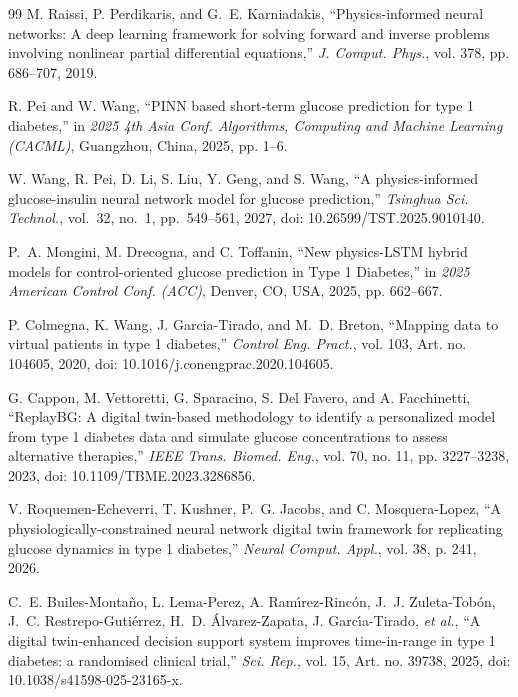 \documentclass[journal]{IEEEtran}
\begin{document}
\begin{thebibliography}{99}
\label{ref8label} M. Raissi, P. Perdikaris, and G.~E. Karniadakis, ``Physics-informed neural networks: A deep learning framework for solving forward and inverse problems involving nonlinear partial differential equations,'' \emph{J. Comput. Phys.}, vol. 378, pp. 686--707, 2019.

\label{ref9label} R. Pei and W. Wang, ``PINN based short-term glucose prediction for type 1 diabetes,'' in \emph{2025 4th Asia Conf. Algorithms, Computing and Machine Learning (CACML)}, Guangzhou, China, 2025, pp. 1--6.

\label{ref11label} W. Wang, R. Pei, D. Li, S. Liu, Y. Geng, and S. Wang, ``A physics-informed glucose-insulin neural network model for glucose prediction,'' \emph{Tsinghua Sci. Technol.}, vol.~32, no.~1, pp.~549--561, 2027, doi: 10.26599/TST.2025.9010140.

\label{ref12label} P.~A. Mongini, M. Drecogna, and C. Toffanin, ``New physics-LSTM hybrid models for control-oriented glucose prediction in Type 1 Diabetes,'' in \emph{2025 American Control Conf. (ACC)}, Denver, CO, USA, 2025, pp. 662--667.

\label{ref13label} P. Colmegna, K. Wang, J. Garcia-Tirado, and M.~D. Breton, ``Mapping data to virtual patients in type 1 diabetes,'' \emph{Control Eng. Pract.}, vol. 103, Art. no. 104605, 2020, doi: 10.1016/j.conengprac.2020.104605.

\label{ref14label} G. Cappon, M. Vettoretti, G. Sparacino, S. Del Favero, and A. Facchinetti, ``ReplayBG: A digital twin-based methodology to identify a personalized model from type 1 diabetes data and simulate glucose concentrations to assess alternative therapies,'' \emph{IEEE Trans. Biomed. Eng.}, vol. 70, no. 11, pp. 3227--3238, 2023, doi: 10.1109/TBME.2023.3286856.

\label{ref16label} V. Roquemen-Echeverri, T. Kushner, P.~G. Jacobs, and C. Mosquera-Lopez, ``A physiologically-constrained neural network digital twin framework for replicating glucose dynamics in type 1 diabetes,'' \emph{Neural Comput. Appl.}, vol. 38, p. 241, 2026.

\label{ref17label} C.~E. Builes-Monta\~no, L. Lema-Perez, A. Ram\'{\i}rez-Rinc\'on, J.~J. Zuleta-Tob\'on, J.~C. Restrepo-Guti\'errez, H.~D. \'Alvarez-Zapata, J. Garc\'{\i}a-Tirado, \emph{et al.}, ``A digital twin-enhanced decision support system improves time-in-range in type 1 diabetes: a randomised clinical trial,'' \emph{Sci. Rep.}, vol. 15, Art. no. 39738, 2025, doi: 10.1038/s41598-025-23165-x.


\end{thebibliography}
\end{document}
